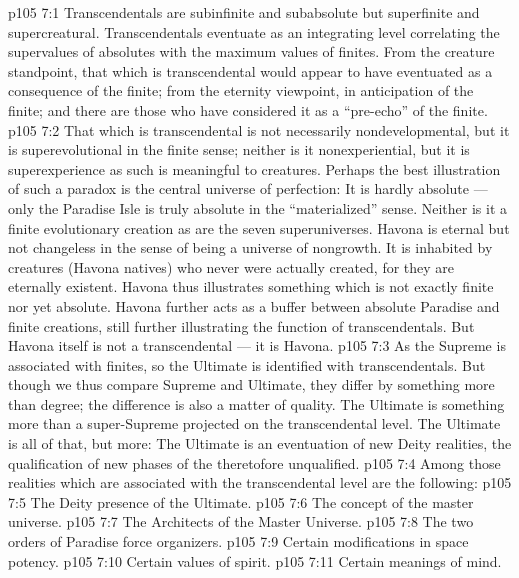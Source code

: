 \vs p105 7:1 Transcendentals are subinfinite and subabsolute but superfinite and supercreatural. Transcendentals eventuate as an integrating level correlating the supervalues of absolutes with the maximum values of finites. From the creature standpoint, that which is transcendental would appear to have eventuated as a consequence of the finite; from the eternity viewpoint, in anticipation of the finite; and there are those who have considered it as a “pre\hyp{}echo” of the finite.
\vs p105 7:2 That which is transcendental is not necessarily nondevelopmental, but it is superevolutional in the finite sense; neither is it nonexperiential, but it is superexperience as such is meaningful to creatures. Perhaps the best illustration of such a paradox is the central universe of perfection: It is hardly absolute --- only the Paradise Isle is truly absolute in the “materialized” sense. Neither is it a finite evolutionary creation as are the seven superuniverses. Havona is eternal but not changeless in the sense of being a universe of nongrowth. It is inhabited by creatures (Havona natives) who never were actually created, for they are eternally existent. Havona thus illustrates something which is not exactly finite nor yet absolute. Havona further acts as a buffer between absolute Paradise and finite creations, still further illustrating the function of transcendentals. But Havona itself is not a transcendental --- it is Havona.
\vs p105 7:3 As the Supreme is associated with finites, so the Ultimate is identified with transcendentals. But though we thus compare Supreme and Ultimate, they differ by something more than degree; the difference is also a matter of quality. The Ultimate is something more than a super\hyp{}Supreme projected on the transcendental level. The Ultimate is all of that, but more: The Ultimate is an eventuation of new Deity realities, the qualification of new phases of the theretofore unqualified.
\vs p105 7:4 \pc Among those realities which are associated with the transcendental level are the following:
\vs p105 7:5 \bibnobreakspace The Deity presence of the Ultimate.
\vs p105 7:6 \bibnobreakspace The concept of the master universe.
\vs p105 7:7 \bibnobreakspace The Architects of the Master Universe.
\vs p105 7:8 \bibnobreakspace The two orders of Paradise force organizers.
\vs p105 7:9 \bibnobreakspace Certain modifications in space potency.
\vs p105 7:10 \bibnobreakspace Certain values of spirit.
\vs p105 7:11 \bibnobreakspace Certain meanings of mind.
